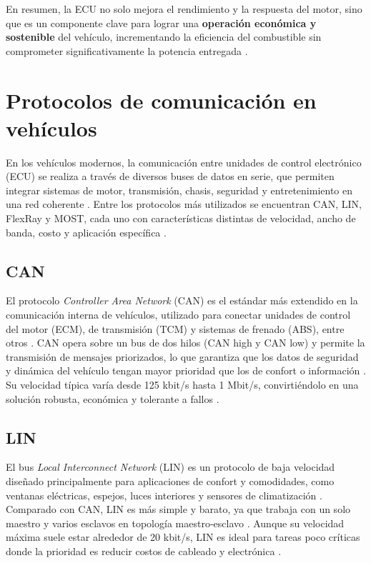 En resumen, la ECU no solo mejora el rendimiento y la respuesta del motor, sino que es un componente clave para lograr una \textbf{operación económica y sostenible} del vehículo, incrementando la eficiencia del combustible sin comprometer significativamente la potencia entregada \citep{Bosch_EngineManagement, SERNAUTO_ECUeficiencia}.

\section{Protocolos de comunicación en vehículos}

En los vehículos modernos, la comunicación entre unidades de control electrónico (ECU) se realiza a través de diversos buses de datos en serie, que permiten integrar sistemas de motor, transmisión, chasis, seguridad y entretenimiento en una red coherente \citep{Navixy_AutomotiveBuses, MSG_CommunicationBuses}. Entre los protocolos más utilizados se encuentran CAN, LIN, FlexRay y MOST, cada uno con características distintas de velocidad, ancho de banda, costo y aplicación específica \citep{ProtocolosComunicacionAutomotriz}.

\subsection{CAN}

El protocolo \textit{Controller Area Network} (CAN) es el estándar más extendido en la comunicación interna de vehículos, utilizado para conectar unidades de control del motor (ECM), de transmisión (TCM) y sistemas de frenado (ABS), entre otros \citep{Navixy_AutomotiveBuses}. CAN opera sobre un bus de dos hilos (CAN high y CAN low) y permite la transmisión de mensajes priorizados, lo que garantiza que los datos de seguridad y dinámica del vehículo tengan mayor prioridad que los de confort o información \citep{ProtocolosComunicacionAutomotriz}. Su velocidad típica varía desde 125 kbit/s hasta 1 Mbit/s, convirtiéndolo en una solución robusta, económica y tolerante a fallos \citep{MSG_CommunicationBuses}.

\subsection{LIN}

El bus \textit{Local Interconnect Network} (LIN) es un protocolo de baja velocidad diseñado principalmente para aplicaciones de confort y comodidades, como ventanas eléctricas, espejos, luces interiores y sensores de climatización \citep{ProtocolosComunicacionAutomotriz}. Comparado con CAN, LIN es más simple y barato, ya que trabaja con un solo maestro y varios esclavos en topología maestro‑esclavo \citep{MSG_CommunicationBuses}. Aunque su velocidad máxima suele estar alrededor de 20 kbit/s, LIN es ideal para tareas poco críticas donde la prioridad es reducir costos de cableado y electrónica \citep{ProtocolosComunicacionAutomotriz}.

